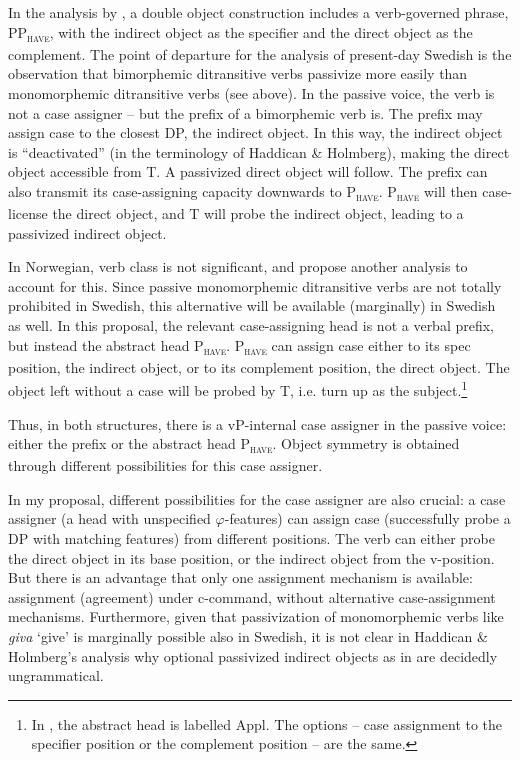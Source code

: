 \documentclass[output=paper]{langscibook}
\begin{document}
In the analysis by \citet{HaddicanHolmberg2019}, a double object construction includes a verb-governed phrase, PP\textsc{\textsubscript{have}}, with the indirect object as the specifier and the direct object as the complement. The point of departure for the analysis of present-day Swedish is the observation that bimorphemic ditransitive verbs passivize more easily than monomorphemic ditransitive verbs (see  above). In the passive voice, the verb is not a case assigner – but the prefix of a bimorphemic verb is. The prefix may assign case to the closest DP, the indirect object. In this way, the indirect object is “deactivated” (in the terminology of Haddican \& Holmberg), making the direct object accessible from T. A passivized direct object will follow. The prefix can also transmit its case-assigning capacity downwards to P\textsc{\textsubscript{have}}. P\textsc{\textsubscript{have}} will then case-license the direct object, and T will probe the indirect object, leading to a passivized indirect object.



In Norwegian, verb class is not significant, and \citet{HaddicanHolmberg2019} propose another analysis to account for this. Since passive monomorphemic ditransitive verbs are not totally prohibited in Swedish, this alternative will be available (marginally) in Swedish as well. In this proposal, the relevant case-assigning head is not a verbal prefix, but instead the abstract head P\textsc{\textsubscript{have}}. P\textsc{\textsubscript{have}} can assign case either to its spec position, the indirect object, or to its complement position, the direct object. The object left without a case will be probed by T, i.e. turn up as the subject.\footnote{In \citet{HolmbergEtAl2019}, the abstract head is labelled Appl. The options – case assignment to the specifier position or the complement position – are the same.} 



Thus, in both structures, there is a vP-internal case assigner in the passive voice: either the prefix or the abstract head P\textsc{\textsubscript{have}}. Object symmetry is obtained through different possibilities for this case assigner. 



In my proposal, different possibilities for the case assigner are also crucial: a case assigner (a head with unspecified $\varphi ${}-features) can assign case (successfully probe a DP with matching features) from different positions. The verb can either probe the direct object in its base position, or the indirect object from the v-position. But there is an advantage that only one assignment mechanism is available: assignment (agreement) under c-command, without alternative case-assignment mechanisms. Furthermore, given that passivization of monomorphemic verbs like \textit{giva} ‘give’ is marginally possible also in Swedish, it is not clear in Haddican \& Holmberg’s analysis why optional passivized indirect objects as in  are decidedly ungrammatical.
\end{document}
